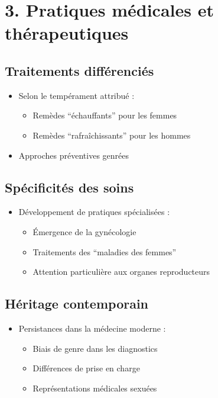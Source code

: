 \documentclass[
  letterpaper,
  DIV=11,
  numbers=noendperiod]{scrreprt}
\providecommand{\tightlist}{%
  \setlength{\itemsep}{0pt}\setlength{\parskip}{0pt}}\usepackage{longtable,booktabs,array}
\begin{document}
\section{3. Pratiques médicales et
thérapeutiques}\label{pratiques-muxe9dicales-et-thuxe9rapeutiques}

\subsection{Traitements
différenciés}\label{traitements-diffuxe9renciuxe9s}

\begin{itemize}
\tightlist
\item
  Selon le tempérament attribué :

  \begin{itemize}
  \tightlist
  \item
    Remèdes ``échauffants'' pour les femmes
  \item
    Remèdes ``rafraîchissants'' pour les hommes
  \end{itemize}
\item
  Approches préventives genrées
\end{itemize}

\subsection{Spécificités des soins}\label{spuxe9cificituxe9s-des-soins}

\begin{itemize}
\tightlist
\item
  Développement de pratiques spécialisées :

  \begin{itemize}
  \tightlist
  \item
    Émergence de la gynécologie
  \item
    Traitements des ``maladies des femmes''
  \item
    Attention particulière aux organes reproducteurs
  \end{itemize}
\end{itemize}

\subsection{Héritage contemporain}\label{huxe9ritage-contemporain}

\begin{itemize}
\tightlist
\item
  Persistances dans la médecine moderne :

  \begin{itemize}
  \tightlist
  \item
    Biais de genre dans les diagnostics
  \item
    Différences de prise en charge
  \item
    Représentations médicales sexuées
  \end{itemize}
\end{itemize}
\end{document}
